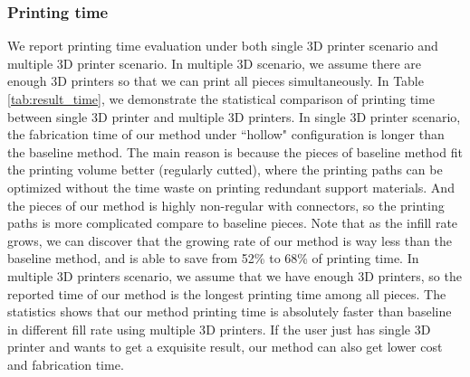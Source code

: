 \subsubsection{Printing time}
We report printing time evaluation under both single 3D printer scenario and multiple 3D printer scenario.
In multiple 3D scenario, we assume there are enough 3D printers so that we can print all pieces simultaneously.
In Table \ref{tab:result_time}, we demonstrate the statistical comparison of printing time between single 3{D} printer and multiple 3{D} printers. 
In single 3{D} printer scenario, the fabrication time of our method under ``hollow" configuration is longer than the baseline method.
The main reason is because the pieces of baseline method fit the printing volume better (regularly cutted), where the printing paths can be optimized without the time waste on printing redundant support materials.
And the pieces of our method is highly non-regular with connectors, so the printing paths is more complicated compare to baseline pieces.
Note that as the infill rate grows, we can discover that the growing rate of our method is way less than the baseline method, and is able to save from 52\% to 68\% of printing time.
In multiple 3{D} printers scenario, we assume that we have enough 3{D} printers, so the reported time of our method is the longest printing time among all pieces.
The statistics shows that our method printing time is absolutely faster than baseline in different fill rate using multiple 3{D} printers. 
If the user just has single 3{D} printer and wants to get a exquisite result, our method can also get lower cost and fabrication time.

